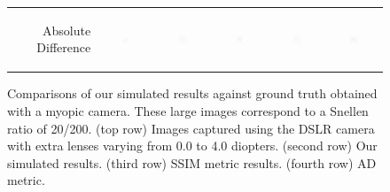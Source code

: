 \begin{figure}[!th]
\begin{tabular}{@{}r@{ } c@{ } c@{ } c@{ } c@{ } c }
	\begin{sideways} \parbox[b]{20mm} {Absolute Difference} \end{sideways} &
	\includegraphics[width=0.185\textwidth]{../../__Images/05/BW_N(20-200)_+0D_to_+4D/bw_N_20-200_Camera+0,00D(diff).png} &
	\includegraphics[width=0.185\textwidth]{../../__Images/05/BW_N(20-200)_+0D_to_+4D/bw_N_20-200_Camera+1,00D(diff).png} &
	\includegraphics[width=0.185\textwidth]{../../__Images/05/BW_N(20-200)_+0D_to_+4D/bw_N_20-200_Camera+2,00D(diff).png} &
	\includegraphics[width=0.185\textwidth]{../../__Images/05/BW_N(20-200)_+0D_to_+4D/bw_N_20-200_Camera+3,00D(diff).png} &
	\includegraphics[width=0.185\textwidth]{../../__Images/05/BW_N(20-200)_+0D_to_+4D/bw_N_20-200_Camera+4,00D(diff).png} \\
 
	\end{tabular}
	
	\caption{Comparisons of our simulated results against ground truth obtained with a myopic camera. These large images correspond to a Snellen ratio of 20/200. (top row) Images captured using the DSLR camera with extra lenses varying from 0.0 to 4.0 diopters. (second row) Our simulated results. (third row) SSIM metric results. (fourth row) AD metric.}
	\label{fig:comparison_myopic_bw}
\end{figure}